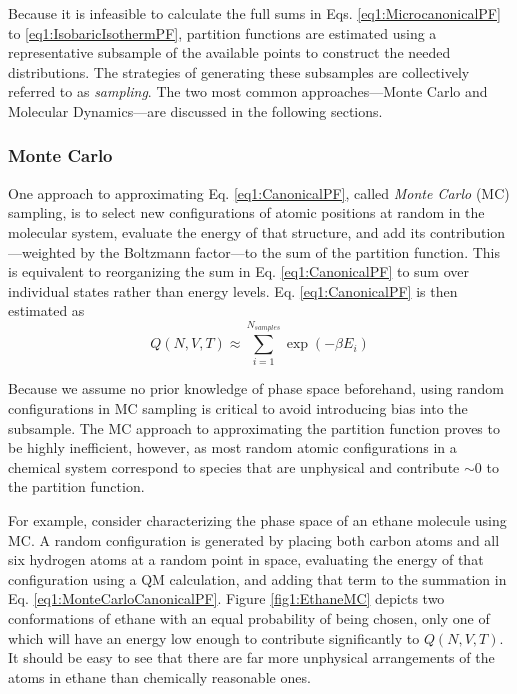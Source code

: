 Because it is infeasible to calculate the full sums in Eqs.
\ref{eq1:MicrocanonicalPF} to \ref{eq1:IsobaricIsothermPF}, partition functions
are estimated using a representative subsample of the available points to
construct the needed distributions. The strategies of generating these
subsamples are collectively referred to as \emph{sampling}. The two most common
approaches---Monte Carlo and Molecular Dynamics---are discussed in the following
sections.

\subsubsection{Monte Carlo}
\label{sec1:MC}

One approach to approximating Eq. \ref{eq1:CanonicalPF}, called \emph{Monte
Carlo} (MC) sampling, is to select new configurations of atomic positions at
random in the molecular system, evaluate the energy of that structure, and add
its contribution---weighted by the Boltzmann factor---to the sum of the
partition function. This is equivalent to reorganizing the sum in Eq.
\ref{eq1:CanonicalPF} to sum over individual states rather than energy levels.
Eq. \ref{eq1:CanonicalPF} is then estimated as
\begin{equation}
   Q(N, V, T) \approx \sum_{i=1}^{N_{samples}} \exp(-\beta E_i)
   \label{eq1:MonteCarloCanonicalPF}
\end{equation}

Because we assume no prior knowledge of phase space beforehand, using random
configurations in MC sampling is critical to avoid introducing bias into the
subsample. The MC approach to approximating the partition function proves to be
highly inefficient, however, as most random atomic configurations in a chemical
system correspond to species that are unphysical and contribute $\sim$0 to the
partition function.

For example, consider characterizing the phase space of an ethane molecule using
MC. A random configuration is generated by placing both carbon atoms and all six
hydrogen atoms at a random point in space, evaluating the energy of that
configuration using a QM calculation, and adding that term to the summation in
Eq. \ref{eq1:MonteCarloCanonicalPF}. Figure \ref{fig1:EthaneMC} depicts two
conformations of ethane with an equal probability of being chosen, only one of
which will have an energy low enough to contribute significantly to $Q(N, V,
T)$. It should be easy to see that there are far more unphysical arrangements of
the atoms in ethane than chemically reasonable ones.

